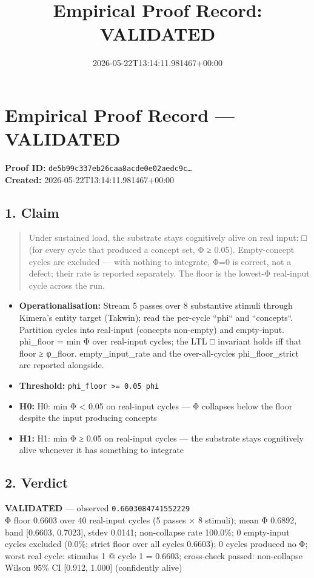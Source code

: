 \documentclass{article}
\title{Empirical Proof Record: VALIDATED}
\date{2026-05-22T13:14:11.981467+00:00}
\begin{document}
\maketitle
\section*{Empirical Proof Record --- \textcolor{validated}{\textbf{VALIDATED}}}
\textbf{Proof ID:} \texttt{de5b99c337eb26caa8acde0e02aedc9c\dots}\\
\textbf{Created:} 2026-05-22T13:14:11.981467+00:00
\subsection*{1. Claim}
\begin{quote}Under sustained load, the substrate stays cognitively alive on real input: □ (for every cycle that produced a concept set, Φ ≥ 0.05). Empty-concept cycles are excluded — with nothing to integrate, Φ=0 is correct, not a defect; their rate is reported separately. The floor is the lowest-Φ real-input cycle across the run.\end{quote}
\begin{itemize}
\item \textbf{Operationalisation:} Stream 5 passes over 8 substantive stimuli through Kimera's entity target (Takwin); read the per-cycle ``phi`` and ``concepts``. Partition cycles into real-input (concepts non-empty) and empty-input. phi\_floor = min Φ over real-input cycles; the LTL □ invariant holds iff that floor ≥ φ\_floor. empty\_input\_rate and the over-all-cycles phi\_floor\_strict are reported alongside.
\item \textbf{Threshold:} \texttt{phi\_floor >= 0.05 phi}
\item \textbf{H0:} H0: min Φ < 0.05 on real-input cycles — Φ collapses below the floor despite the input producing concepts
\item \textbf{H1:} H1: min Φ ≥ 0.05 on real-input cycles — the substrate stays cognitively alive whenever it has something to integrate
\end{itemize}
\subsection*{2. Verdict}
\textcolor{validated}{\textbf{VALIDATED}} --- observed \texttt{0.6603084741552229}\\
Φ floor 0.6603 over 40 real-input cycles (5 passes × 8 stimuli); mean Φ 0.6892, band [0.6603, 0.7023], stdev 0.0141; non-collapse rate 100.0\%; 0 empty-input cycles excluded (0.0\%; strict floor over all cycles 0.6603); 0 cycles produced no Φ; worst real cycle: stimulus 1 @ cycle 1 = 0.6603; cross-check passed: non-collapse Wilson 95\% CI [0.912, 1.000] (confidently alive)
\end{document}
